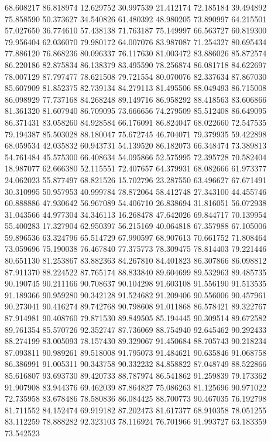 68.608217
86.818974
12.629752
30.997539
21.412174
72.185184
39.494892
75.858590
50.373627
34.540826
61.480392
48.980205
73.890997
64.215501
57.027650
36.774610
57.438138
71.763187
75.149997
66.563727
60.819300
79.956404
62.036070
79.980172
64.007076
83.987087
71.254327
80.695434
77.886120
76.868236
80.096337
76.117630
81.003472
83.886026
85.872574
86.220186
82.875834
86.138379
83.495590
78.256874
86.081718
84.622697
78.007129
87.797477
78.621508
79.721554
80.070076
82.337634
87.867030
85.607909
81.852375
82.739134
84.279113
81.495506
88.049493
86.715008
86.098929
77.737168
84.268248
89.149716
86.958292
88.418563
83.606866
81.361320
81.607940
86.709095
73.666656
74.279509
85.512408
86.649095
86.371431
83.058260
84.928584
66.176091
86.824047
68.022660
72.547535
79.194387
85.503028
88.180047
75.672745
46.704071
79.379935
59.422898
68.059534
42.035832
60.943731
54.139520
86.182073
66.348474
73.389813
54.761484
45.575300
66.408634
54.095866
52.575995
72.395728
70.582404
18.987077
62.666380
52.115551
72.407657
64.379931
68.082666
61.973377
24.062023
55.877497
68.821526
15.702796
23.287550
63.496627
67.671491
30.310995
50.957953
40.999784
78.872064
58.412748
27.343100
44.455746
60.888886
47.930642
56.967089
54.406710
26.838694
31.816051
56.072938
31.043566
44.977304
34.346113
16.268478
47.642026
69.844717
70.139954
55.400283
17.327904
62.950397
56.215169
40.064818
67.357988
67.105006
59.896536
63.324796
65.514729
67.990597
68.907613
70.661752
71.808464
73.059696
75.190038
76.467840
77.375773
78.309475
78.814403
79.221446
80.651130
81.253867
83.882363
84.267810
84.401823
86.307866
86.098812
87.911370
88.224522
87.765174
88.833840
89.604699
89.532963
89.485735
90.190745
90.211166
90.708637
90.104298
91.603108
91.556190
91.513535
91.189366
90.959280
90.342128
91.524682
91.209406
90.556006
90.457961
90.273041
90.416274
89.742768
90.798608
91.011868
86.578421
89.322767
87.914981
90.408760
79.871530
89.849505
85.194445
90.309514
89.672582
89.761354
85.570726
92.352747
87.736069
88.754940
92.645462
90.292433
88.274199
83.005093
78.157430
89.329067
91.450684
88.705743
90.218234
87.093811
90.989261
89.518008
91.795073
91.484621
90.635846
91.068758
86.386991
91.005311
90.343758
90.332232
84.858822
87.048749
88.522866
85.616807
93.693730
89.420733
88.787974
86.541862
91.259839
79.173362
91.907908
83.944376
69.462039
87.864827
75.086263
81.125696
90.971022
72.735958
83.678486
78.580836
86.084425
88.700773
90.467035
76.192798
81.711552
84.152474
69.919182
87.202473
81.617377
68.910358
78.051255
83.112259
78.888282
92.323103
78.116924
76.701966
91.993727
63.183359
73.542523

